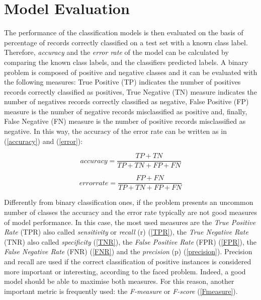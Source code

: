 \documentclass[final,a4paper,12pt,english]{UnicaPhdThesis3}
\begin{document}
\section{Model Evaluation} \label{ME} %
The performance of the classification models is then evaluated on the basis of percentage of records correctly classified on a test set with a known class label. Therefore, \textit{accuracy} and the \textit{error rate} of the model can be calculated by comparing the known class labels, and the classifiers predicted labels. A binary problem is composed of positive and negative classes and it can be evaluated with the following measures: True Positive (\acs{TP}) indicates the number of positives records correctly classified as positives, True Negative (\acs{TN}) measure indicates the number of negatives records correctly classified as negative, False Positive (\acs{FP}) measure is the number of negative records misclassified as positive and, finally, False Negative (\acs{FN}) measure is the number of positive records misclassified as negative. In this way, the accuracy of the error rate can be written as in (\ref{accuracy}) and (\ref{error}):

\begin{equation}\label{accuracy}
accuracy= \frac{TP + TN}{TP + TN + FP + FN}    
\end{equation}

\begin{equation}\label{error}
error rate= \frac{FP + FN}{TP + TN + FP + FN}    
\end{equation}

Differently from binary classification ones, if the problem presents an uncommon number of classes the accuracy and the error rate typically are not good measures of model performance. In this case, the most used measures are the \textit{True Positive Rate} (\acs{TPR}) also called \textit{sensitivity} or \textit{recall} (r) (\ref{TPR}), the \textit{True Negative Rate} (\acs{TNR}) also called \textit{specificity} (\ref{TNR}), the \textit{False Positive Rate} (\acs{FPR}) (\ref{FPR}), the \textit{False Negative Rate} (\acs{FNR}) (\ref{FNR}) and the \textit{precision} (p) (\ref{precision}). Precision and recall are used if the correct classification of positive instances is considered more important or interesting, according to the faced problem. Indeed, a good model should be able to maximise both measures. For this reason, another important metric is frequently used: the \textit{F-measure} or \textit{F-score} (\ref{Fmeasure}).
\end{document}
